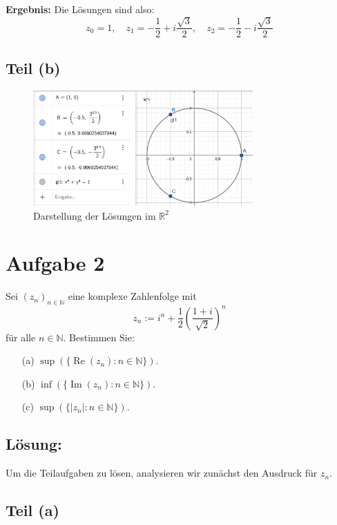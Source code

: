 \documentclass[11pt]{article}
\begin{document}
\textbf{Ergebnis:} Die Lösungen sind also:
\[
z_0 = 1, \quad z_1 = -\frac{1}{2} + i\frac{\sqrt{3}}{2}, \quad z_2 = -\frac{1}{2} - i\frac{\sqrt{3}}{2}
\]

\clearpage

\subsection*{Teil (b)}

\begin{figure}[h]
    \centering
    \includegraphics[width=0.75\textwidth]{img/a1_4_1.png}
    \caption{Darstellung der Lösungen im \(\mathbb{R}^2\)}
\end{figure}

\section*{Aufgabe 2}

Sei \( (z_n)_{n \in \mathbb{N}} \) eine komplexe Zahlenfolge mit
\[
z_n := i^n + \frac{1}{2} \left( \frac{1 + i}{\sqrt{2}} \right)^n
\]
für alle \( n \in \mathbb{N} \). Bestimmen Sie:

\begin{enumerate}
    \item[(a)] \( \sup(\{\operatorname{Re}(z_n) : n \in \mathbb{N}\}) \).
    \item[(b)] \( \inf(\{\operatorname{Im}(z_n) : n \in \mathbb{N}\}) \).
    \item[(c)] \( \sup(\{|z_n| : n \in \mathbb{N}\}) \).
\end{enumerate}

\subsection*{Lösung:}

Um die Teilaufgaben zu lösen, analysieren wir zunächst den Ausdruck für \( z_n \).

\subsection*{Teil (a)}
\end{document}
